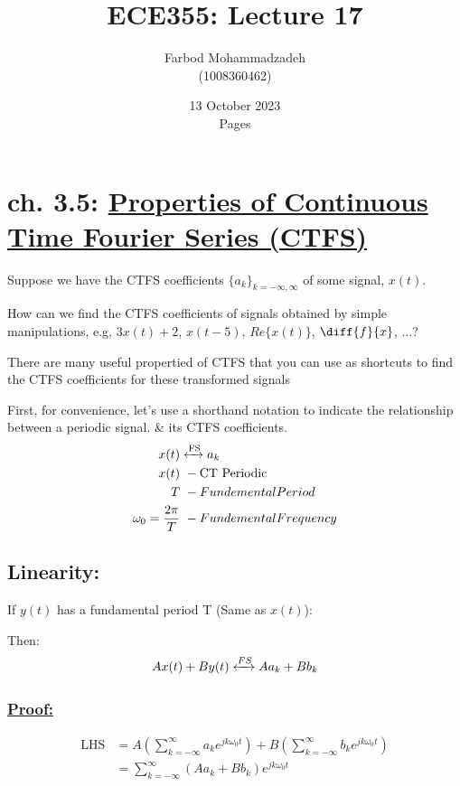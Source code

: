 \documentclass{article}
\title{ECE355: Lecture 17}
\author{Farbod Mohammadzadeh\\
    (1008360462)\\}
\date{13 October 2023\\ \pageref{LastPage} Pages}
\begin{document}
\Large
\maketitle
{\normalsize \tableofcontents}
\newpage
\section{ch. 3.5: \underline{Properties of Continuous Time Fourier Series (CTFS)}}
Suppose we have the CTFS coefficients $\{a_k\}_{k= - \infty , \infty}$ of some signal, $x(t)$.

How can we find the CTFS coefficients of signals obtained by simple manipulations, e.g, $3x(t)+2$, $x(t-5)$, $Re\{x(t)\}$, $\diff{f}{x}$, $\dots$?

{\color{ForestGreen} There are many useful propertied of CTFS that you can use as shortcuts to find the CTFS coefficients for these transformed signals}

First, for convenience, let's use a shorthand notation to indicate the relationship between a periodic signal. \& its CTFS coefficients.
\begin{align}
    x(t)                      & \xleftrightarrow[]{\text{FS}} a_k \\
    x(t)                      & \ - \text{CT Periodic}            \\
    T                         & \ - Fundemental Period            \\
    \omega_0 = \frac{2\pi}{T} & \ - Fundemental Frequency
\end{align}

\subsection{Linearity:}
If $y(t)$ has a fundamental period T {\color{ForestGreen}(Same as $x(t)$)}:

Then:
\begin{equation}
    Ax(t) + By(t) \xleftrightarrow[]{FS}{Aa_k + Bb_k}
\end{equation}

\subsubsection{\underline{Proof:}}
\begin{align}
    \text{LHS} & = A (\sum^{\infty}_{k= - \infty} a_k e^{jk \omega_0 t}) + B (\sum^{\infty}_{k= - \infty} b_k e^{jk \omega_0 t}) \\
               & =\sum^{\infty}_{k= - \infty} (Aa_k + Bb_k) e^{jk \omega_0 t}
\end{align}
\end{document}
